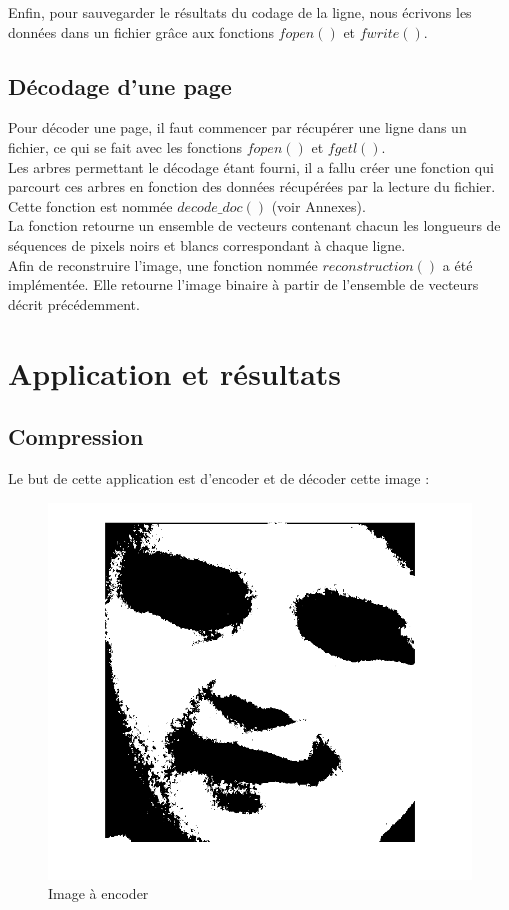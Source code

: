 \documentclass[11pt]{article}
\begin{document}
  Enfin, pour sauvegarder le résultats du codage de la ligne, nous écrivons les données dans un fichier grâce aux fonctions $fopen()$ et $fwrite()$.
  
  \subsection{Décodage d'une page}
  
  Pour décoder une page, il faut commencer par récupérer une ligne dans un fichier, ce qui se fait avec les fonctions $fopen()$ et $fgetl()$.\\
  Les arbres permettant le décodage étant fourni, il a fallu créer une fonction qui parcourt ces arbres en fonction des données récupérées par la lecture du fichier. Cette fonction est nommée $decode\_doc()$ (voir Annexes).\\
  La fonction retourne un ensemble de vecteurs contenant chacun les longueurs de séquences de pixels noirs et blancs correspondant à chaque ligne.\\
  Afin de reconstruire l'image, une fonction nommée $reconstruction()$ a été implémentée. Elle retourne l'image binaire à partir de l'ensemble de vecteurs décrit précédemment.

\newpage

\section{Application et résultats}
  
  \subsection{Compression}
  
  Le but de cette application est d'encoder et de décoder cette image :
  
  	\begin{figure}[H]
  	  \centering
  	  \includegraphics[scale=0.6]{img/img_ori.png}
  	  \caption{Image à encoder}
  	  \label{img1}
  	\end{figure}
\end{document}
